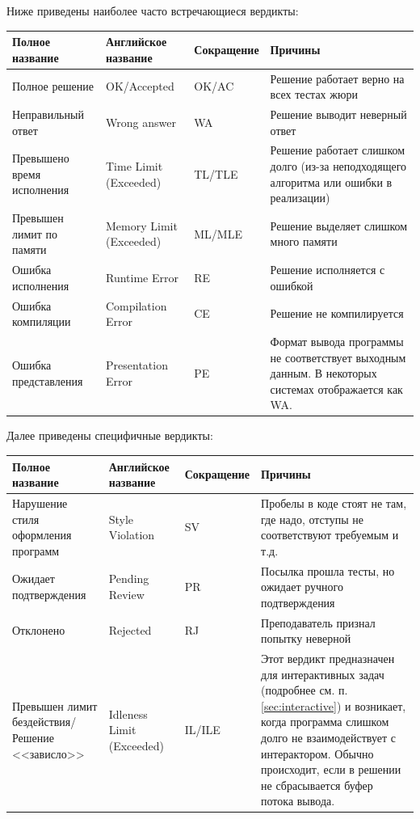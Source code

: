 \documentclass{article}
\begin{document}
	Ниже приведены наиболее часто встречающиеся вердикты:

	\begin{table}[H]
    \centering
    \begin{tabularx}{\textwidth}{|X|X|X|X|}
        \hline
		\textbf{Полное название} & \textbf{Английское название} & \textbf{Сокращение} & \textbf{Причины} \\
		\hline
		Полное решение & OK/Accepted & OK/AC & Решение работает верно на всех тестах жюри\\
		\hline
		Неправильный ответ & Wrong answer & WA & Решение выводит неверный ответ\\
		\hline
		Превышено время исполнения & Time Limit (Exceeded) & TL/TLE & Решение работает слишком долго (из-за неподходящего алгоритма или ошибки в реализации)\\
		\hline
		Превышен лимит по памяти & Memory Limit (Exceeded) & ML/MLE & Решение выделяет слишком много памяти\\
		\hline
		Ошибка исполнения & Runtime Error & RE & Решение исполняется с ошибкой\\
		\hline
		Ошибка компиляции & Compilation Error & CE & Решение не компилируется\\
		\hline
		Ошибка представления & Presentation Error & PE & Формат вывода программы не соответствует выходным данным. В некоторых системах отображается как WA.\\
		\hline
    \end{tabularx}
	\end{table}

	Далее приведены специфичные вердикты:

	\begin{table}[H]
    \centering
    \begin{tabularx}{\textwidth}{|X|X|X|X|}
		\hline
		\textbf{Полное название} & \textbf{Английское название} & \textbf{Сокращение} & \textbf{Причины} \\
		\hline
		Нарушение стиля оформления программ & Style Violation & SV & Пробелы в коде стоят не там, где надо, отступы не соответствуют требуемым и т.д.\\
		\hline
		Ожидает подтверждения & Pending Review & PR & Посылка прошла тесты, но ожидает ручного подтверждения\\
		\hline
		Отклонено & Rejected & RJ & Преподаватель признал попытку неверной\\
		\hline
		Превышен лимит бездействия/Решение <<зависло>> & Idleness Limit (Exceeded) & IL/ILE & Этот вердикт предназначен для интерактивных задач (подробнее см. п. \ref*{sec:interactive}) и возникает, когда программа слишком долго не взаимодействует с интерактором. Обычно происходит, если в решении не сбрасывается буфер потока вывода.\\
		\hline
	\end{tabularx}
	\end{table}
	
\end{document}
